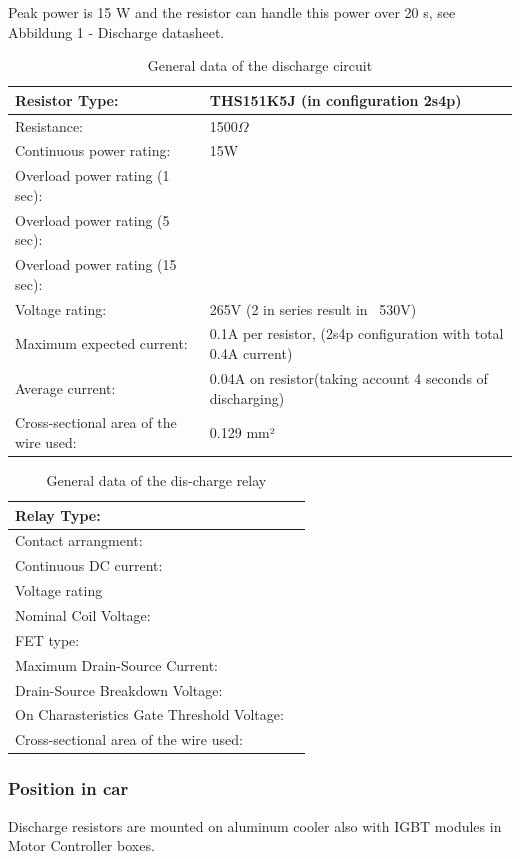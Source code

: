 Peak power is 15 W and the resistor can handle this power over 20 s, see Abbildung 1 - Discharge datasheet.

\begin{table}[H]
	\centering
	\caption{General data of the discharge circuit}
	\begin{tabularx}{\textwidth}{|X|X|}
		\hline
		Resistor Type: & THS151K5J (in configuration 2s4p) \\[\TableSize]
		\hline
		Resistance: & 1500$\Omega$ \\[\TableSize]
		\hline
		Continuous power rating: & 15W \\[\TableSize]
		\hline
		Overload power rating (1 sec): & \\[\TableSize]
		\hline
		Overload power rating (5 sec): &  \\[\TableSize]
		\hline
		Overload power rating (15 sec): &  \\[\TableSize]
		\hline
		Voltage rating: & 265V (2 in series result in ~530V) \\[\TableSize]
		\hline
		Maximum expected current: & 0.1A per resistor, (2s4p configuration with total 0.4A current) \\[\TableSize]
		\hline
		Average current: & 0.04A on resistor(taking account 4 seconds of discharging) \\[\TableSize]
		\hline
		Cross-sectional area of the wire used: & 0.129 mm² \\[\TableSize]
		\hline
	\end{tabularx}%
	\label{tab:dischrage-circ}%
\end{table}%

\begin{table}[H]
	\centering
	\caption{General data of the dis-charge relay}
	\begin{tabularx}{\textwidth}{|X|X|}
		\hline
		Relay Type: &  \\[\TableSize]
		\hline
		Contact arrangment: &  \\[\TableSize]
		\hline
		Continuous DC current:  &  \\[\TableSize]
		\hline
		Voltage rating  & \\[\TableSize]
		\hline
		Nominal Coil Voltage: & \\[\TableSize]
		\hline
		FET type: &  \\[\TableSize]
		\hline
		Maximum Drain-Source Current: &\\[\TableSize]
		\hline
		Drain-Source Breakdown Voltage: &  \\[\TableSize]
		\hline
		On Charasteristics Gate Threshold Voltage: & \\[\TableSize]
		\hline
		Cross-sectional area of the wire used: & \\[\TableSize]
		\hline
	\end{tabularx}%
	\label{tab:discharge-relay}%
\end{table}%


\subsubsection{Position in car}

Discharge resistors are mounted on aluminum cooler also with IGBT modules in Motor Controller boxes.